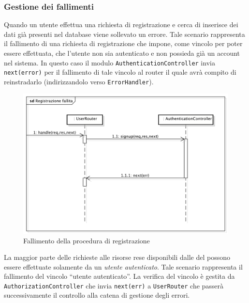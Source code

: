 \subsubsection{Gestione dei fallimenti}
\label{regFailed}
Quando un utente effettua una richiesta di registrazione e cerca di inserisce dei dati già presenti nel database viene sollevato un errore.
Tale scenario rappresenta il fallimento di una richiesta di registrazione che impone, come vincolo per poter essere effettuata, che l'utente non sia autenticato e non possieda già un account nel sistema. In questo caso il modulo \texttt{AuthenticationController} invia \texttt{next(error)} per il fallimento di tale vincolo al router il quale avrà compito di reinstradarlo (indirizzandolo verso \texttt{ErrorHandler}).
\begin{center}
\begin{figure}[h]
\centering
\includegraphics[scale=0.35,keepaspectratio]{diagrammi/sequenza/BackEnd/authFailed.pdf}
\caption{Fallimento della procedura di registrazione}
\end{figure}
\FloatBarrier
\end{center}
\label{userFailed}
La maggior parte delle richieste alle risorse rese disponibili dalle  del  possono essere effettuate solamente da un \emph{utente autenticato}. Tale scenario rappresenta il fallimento del vincolo ``utente autenticato''. La verifica del vincolo è gestita da \texttt{AuthorizationController} che invia \texttt{next(err)} a \texttt{UserRouter} che passerà successivamente il controllo alla catena di gestione degli errori.
